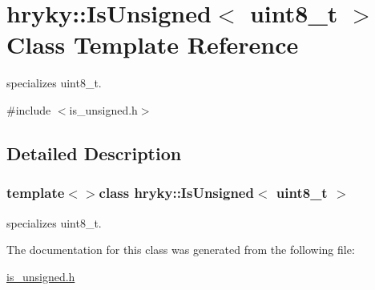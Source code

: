 \hypertarget{classhryky_1_1_is_unsigned_3_01uint8__t_01_4}{\section{hryky\-:\-:Is\-Unsigned$<$ uint8\-\_\-t $>$ Class Template Reference}
\label{classhryky_1_1_is_unsigned_3_01uint8__t_01_4}
}


specializes uint8\-\_\-t.  




{\ttfamily \#include $<$is\-\_\-unsigned.\-h$>$}



\subsection{Detailed Description}
\subsubsection*{template$<$$>$class hryky\-::\-Is\-Unsigned$<$ uint8\-\_\-t $>$}

specializes uint8\-\_\-t. 

The documentation for this class was generated from the following file\-:\begin{DoxyCompactItemize}
\item 
\hyperlink{is__unsigned_8h}{is\-\_\-unsigned.\-h}\end{DoxyCompactItemize}
